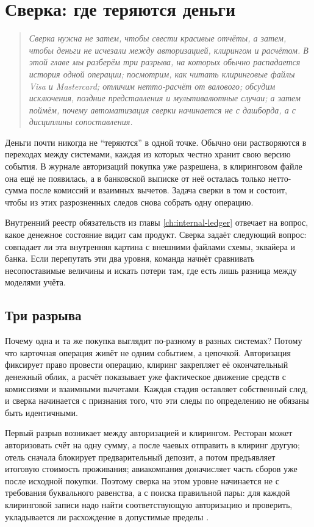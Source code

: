 
\chapter{Сверка: где теряются деньги}
\label{ch:reconciliation}
\begin{quote}
  \itshape
  Сверка нужна не затем, чтобы свести красивые отчёты, а затем, чтобы
  деньги не исчезали между авторизацией, клирингом и расчётом. В этой
  главе мы разберём три разрыва, на которых обычно распадается история
  одной операции; посмотрим, как читать клиринговые файлы Visa и
  Mastercard; отличим нетто-расчёт от валового; обсудим исключения,
  поздние представления и мультивалютные случаи; а затем поймём,
  почему автоматизация сверки начинается не с дашборда, а с
  дисциплины сопоставления.
\end{quote}

Деньги почти никогда не \enquote{теряются} в одной точке.
Обычно они растворяются в переходах между системами, каждая из которых
честно хранит свою версию события. В журнале авторизаций покупка уже
разрешена, в клиринговом файле она ещё не появилась, а в банковской
выписке от неё осталась только нетто-сумма после комиссий и взаимных
вычетов. Задача сверки в том и состоит, чтобы из этих разрозненных
следов снова собрать одну операцию.

Внутренний реестр обязательств из главы \ref{ch:internal-ledger}
отвечает на вопрос, какое денежное состояние видит сам продукт.
Сверка задаёт следующий вопрос: совпадает ли эта внутренняя картина
с внешними файлами схемы, эквайера и банка. Если перепутать эти два
уровня, команда начнёт сравнивать несопоставимые величины и искать
потери там, где есть лишь разница между моделями учёта.

\section{Три разрыва}
\label{sec:recon-gaps}

Почему одна и та же покупка выглядит по-разному в разных системах?
Потому что карточная операция живёт не одним событием, а цепочкой.
Авторизация фиксирует право провести операцию, клиринг закрепляет
её окончательный денежный облик, а расчёт показывает уже фактическое
движение средств с комиссиями и взаимными вычетами. Каждая стадия
оставляет собственный след, и сверка начинается с признания того, что
эти следы по определению не обязаны быть идентичными.

Первый разрыв возникает между авторизацией и клирингом. Ресторан может
авторизовать счёт на одну сумму, а после чаевых отправить в клиринг
другую; отель сначала блокирует предварительный депозит, а потом
предъявляет итоговую стоимость проживания; авиакомпания доначисляет
часть сборов уже после исходной покупки. Поэтому сверка на этом уровне
начинается не с требования буквального равенства, а с поиска правильной
пары: для каждой клиринговой записи надо найти соответствующую
авторизацию и проверить, укладывается ли расхождение в допустимые
пределы \cite{visa-tadg}\cite{mc-tpr}.

